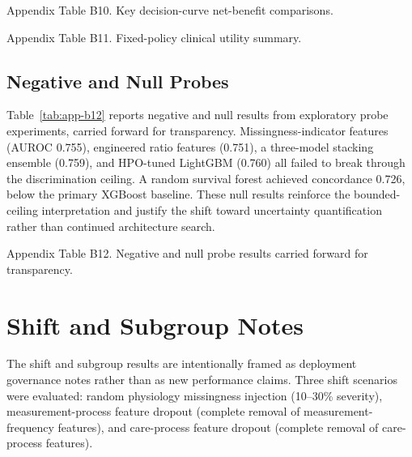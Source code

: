 \begin{appendices}
\begin{table}[!t]
\centering
\scriptsize
\caption{Appendix Table B10. Key decision-curve net-benefit comparisons.}
\label{tab:app-b10}
\begin{adjustbox}{max width=\textwidth}

\end{adjustbox}
\end{table}

\begin{table}[!t]
\centering
\scriptsize
\caption{Appendix Table B11. Fixed-policy clinical utility summary.}
\label{tab:app-b11}
\begin{adjustbox}{max width=\textwidth}

\end{adjustbox}
\end{table}

\subsection{Negative and Null Probes}

Table~\ref{tab:app-b12} reports negative and null results from exploratory probe experiments, carried forward for transparency. Missingness-indicator features (AUROC 0.755), engineered ratio features (0.751), a three-model stacking ensemble (0.759), and HPO-tuned LightGBM (0.760) all failed to break through the discrimination ceiling. A random survival forest achieved concordance 0.726, below the primary XGBoost baseline. These null results reinforce the bounded-ceiling interpretation and justify the shift toward uncertainty quantification rather than continued architecture search.

\begin{table}[!t]
\centering
\small
\caption{Appendix Table B12. Negative and null probe results carried forward for transparency.}
\label{tab:app-b12}
\begin{adjustbox}{max width=\textwidth}

\end{adjustbox}
\end{table}

\section{Shift and Subgroup Notes}\label{app:shift}

The shift and subgroup results are intentionally framed as deployment governance notes rather than as new performance claims. Three shift scenarios were evaluated: random physiology missingness injection (10--30\% severity), measurement-process feature dropout (complete removal of measurement-frequency features), and care-process feature dropout (complete removal of care-process features).


\end{appendices}
